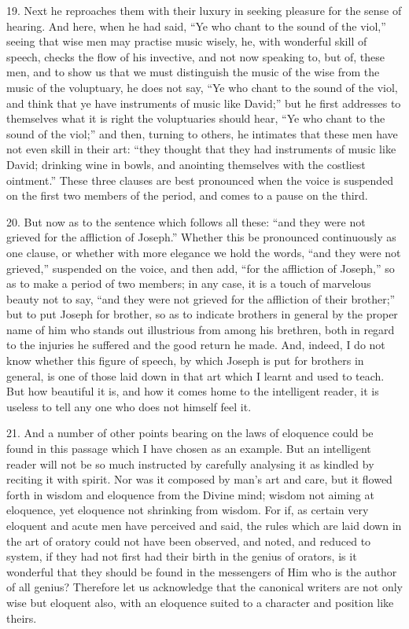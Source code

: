 19. Next he reproaches them with their luxury in seeking pleasure for the sense of hearing. And here, when he had said, “Ye who chant to the sound of the viol,” seeing that wise men may practise music wisely, he, with wonderful skill of speech, checks the flow of his invective, and not now speaking to, but of, these men, and to show us that we must distinguish the music of the wise from the  music of the voluptuary, he does not say, “Ye who chant to the sound of the viol, and think that ye have instruments of music like David;” but he first addresses to themselves what it is right the voluptuaries should hear, “Ye who chant to the sound of the viol;” and then, turning to others, he intimates that these men have not even skill in their art: “they thought that they had instruments of music like David; drinking wine in bowls, and anointing themselves with the costliest ointment.” These three clauses are best pronounced when the voice is suspended on the first two members of the period, and comes to a pause on the third.

20. But now as to the sentence which follows all these: “and they were not grieved for the affliction of Joseph.” Whether this be pronounced continuously as one clause, or whether with more elegance we hold the words, “and they were not grieved,” suspended on the voice, and then add, “for the affliction of Joseph,” so as to make a period of two members; in any case, it is a touch of marvelous beauty not to say, “and they were not grieved for the affliction of their brother;” but to put Joseph for brother, so as to indicate brothers in general by the proper name of him who stands out illustrious from among his brethren, both in regard to the injuries he suffered and the good return he made. And, indeed, I do not know whether this figure of speech, by which Joseph is put for brothers in general, is one of those laid down in that art which I learnt and used to teach. But how beautiful it is, and how it comes home to the intelligent reader, it is useless to tell any one who does not himself feel it.

21. And a number of other points bearing on the laws of eloquence could be found in this passage which I have chosen as an example. But an intelligent reader will not be so much instructed by carefully analysing it as kindled by reciting it with spirit. Nor was it composed by man’s art and care, but it flowed forth in wisdom and eloquence from the Divine mind; wisdom not aiming at eloquence, yet eloquence not shrinking from wisdom. For if, as certain very eloquent and acute men have perceived and said, the rules which are laid down in the art of oratory could not have been observed, and noted, and reduced to system, if they had not first had their birth in the genius of orators, is it wonderful that they should be found in the messengers of Him who is the author of all genius? Therefore let us acknowledge that the canonical writers are not only wise but eloquent also, with an eloquence suited to a character and position like theirs.


